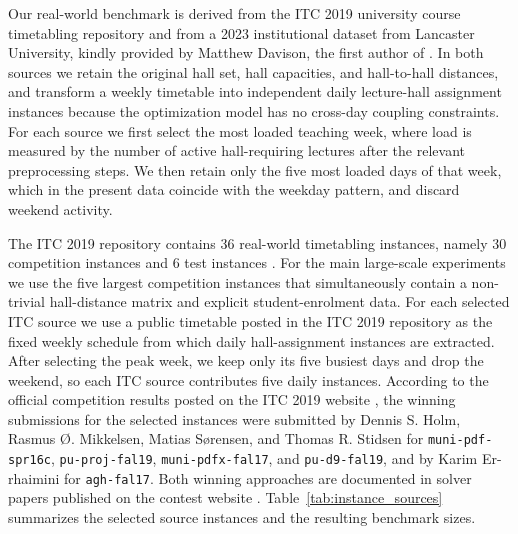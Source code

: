 \documentclass[11pt]{article}
\begin{document}
Our real-world benchmark is derived from the ITC 2019 university course timetabling repository \citep{muller2025itc2019} and from a 2023 institutional dataset from Lancaster University, kindly provided by Matthew Davison, the first author of \citet{davison2025}. In both sources we retain the original hall set, hall capacities, and hall-to-hall distances, and transform a weekly timetable into independent daily lecture-hall assignment instances because the optimization model has no cross-day coupling constraints. For each source we first select the most loaded teaching week, where load is measured by the number of active hall-requiring lectures after the relevant preprocessing steps. We then retain only the five most loaded days of that week, which in the present data coincide with the weekday pattern, and discard weekend activity.

The ITC 2019 repository contains 36 real-world timetabling instances, namely 30 competition instances and 6 test instances \citep{muller2025itc2019}. For the main large-scale experiments we use the five largest competition instances that simultaneously contain a non-trivial hall-distance matrix and explicit student-enrolment data. For each selected ITC source we use a public timetable posted in the ITC 2019 repository as the fixed weekly schedule from which daily hall-assignment instances are extracted. After selecting the peak week, we keep only its five busiest days and drop the weekend, so each ITC source contributes five daily instances. According to the official competition results posted on the ITC 2019 website \citep{itc2019awards}, the winning submissions for the selected instances were submitted by Dennis S. Holm, Rasmus {\O}. Mikkelsen, Matias S{\o}rensen, and Thomas R. Stidsen for \texttt{muni-pdf-spr16c}, \texttt{pu-proj-fal19}, \texttt{muni-pdfx-fal17}, and \texttt{pu-d9-fal19}, and by Karim Er-rhaimini for \texttt{agh-fal17}. Both winning approaches are documented in solver papers published on the contest website \citep{holm2020itc2019,errhaimini2020itc2019}. Table~\ref{tab:instance_sources} summarizes the selected source instances and the resulting benchmark sizes.
\end{document}
